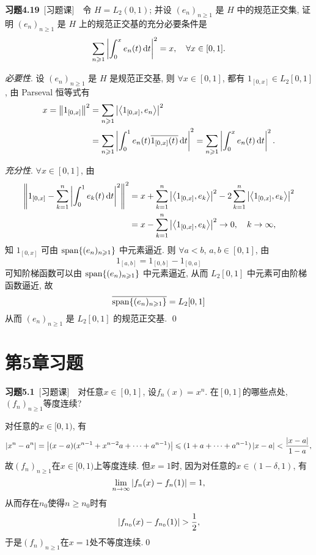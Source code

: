 	\textbf{习题4.19}\ [习题课]\ \ 令 $ H=L_{2}(0, 1) $; 并设 $ (e_{n})_{n\geqslant1} $ 是 $ H $ 中的规范正交集, 证明 $ (e_{n})_{n\geqslant1} $ 是 $ H $ 上的规范正交基的充分必要条件是
	\[
		\sum_{n\geqslant1}\left| \int_{0}^{x}e_{n}(t)\,\mathrm{d} t \right| ^{2} = x, \quad \forall x\in[0, 1].
	\]
	\begin{Proof}
		\textsl{必要性}. 设 $ (e_{n})_{n\geqslant1} $ 是 $ H $ 是规范正交基, 则 $ \forall x\in[0, 1] $, 都有 $ 1_{[0, x]}\in L_{2}[0, 1] $, 由 Parseval 恒等式有
		\[
			\begin{aligned}
				x = \left\| 1_{[0, x]} \right\|^{2} & =\sum_{n\geqslant1}\left| \left\langle 1_{[0, x]}, e_{n} \right\rangle \right| ^{2}\\
				& =\sum_{n\geqslant1}\left| \int_{0}^{1}e_{n}(t)\overline{1_{[0, x]}(t)}\,\mathrm{d} t \right| ^{2}=\sum_{n\geqslant1}\left| \int_{0}^{x}e_{n}(t)\,\mathrm{d} t \right| ^{2}.
			\end{aligned}
		\]

		\textsl{充分性}. $ \forall x\in[0, 1] $, 由
		\[
			\begin{aligned}
				\left\| 1_{[0, x]}-\sum_{k=1}^{n}\left| \int_{0}^{1}e_{k}(t)\,\mathrm{d} t \right| ^{2} \right\|^{2} & = x+\sum_{k=1}^{n}\left| \left\langle 1_{[0, x]}, e_{k} \right\rangle \right| ^{2}-2\sum_{k=1}^{n}\left| \left\langle 1_{[0, x]}, e_{k} \right\rangle \right| ^{2} \\
			& = x-\sum_{k=1}^{n}\left| \left\langle 1_{[0, x]}, e_{k} \right\rangle \right| ^{2}\to 0,\quad k\to\infty,
			\end{aligned}
		\]
		知 $ 1_{[0, x]} $ 可由 $ \operatorname{span}\{ (e_{n})_{n\geqslant1} \} $ 中元素逼近. 则 $ \forall a<b $, $ a, b\in[0, 1] $, 由
		\[
			1_{[a, b]} = 1_{[0, b]}-1_{[0, a]}
		\]
		可知阶梯函数可以由 $ \operatorname{span}\{ (e_{n})_{n\geqslant1} \} $ 中元素逼近, 从而 $ L_{2}[0, 1] $ 中元素可由阶梯函数逼近, 故
		\[
			\overline{\operatorname{span}\{ (e_{n})_{n\geqslant1} \}}=L_{2}[0, 1]
		\]
		从而 $ (e_{n})_{n\geqslant1} $ 是 $ L_{2}[0, 1] $ 的规范正交基. \qed
	\end{Proof}	

\section{第5章习题}

	\textbf{习题5.1}\ [习题课]\ \ 对任意$ x\in[0,1] $, 设$ f_n(x)=x^n $. 在$ [0,1] $的哪些点处, $ (f_n)_{n\geqslant 1} $等度连续?
	\begin{Proof}
	对任意的$ x\in[0,1) $, 有
	\[
	\left| x^n-a^n \right| =\left| (x-a)(x^{n-1}+x^{n-2}a+\cdots+a^{n-1}) \right| \leqslant(1+a+\cdots+a^{n-1})\left| x-a \right| <\frac{\left| x-a \right| }{1-a},
	\]
	故$ (f_n)_{n\geqslant 1} $在$ x\in[0,1) $上等度连续. 但$ x=1 $时, 因为对任意的$ x\in(1-\delta,1) $, 有
	\[
	\lim_{n\to\infty}\left| f_n(x)-f_n(1) \right| =1,
	\]
	从而存在$ n_0 $使得$ n\geqslant n_0 $时有
	\[
	\left| f_{n_0}(x)-f_{n_0}(1) \right| >\frac{1}{2},
	\]
	于是$ (f_n)_{n\geqslant 1} $在$ x=1 $处不等度连续.\qed
	\end{Proof}

